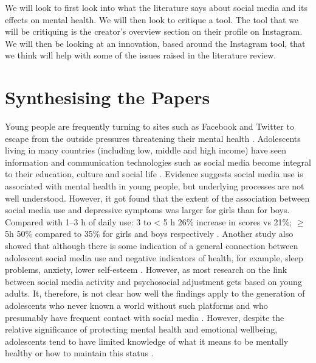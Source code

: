\documentclass{sigchi}
\begin{document}
	We will look to first look into what the literature says about social media and its effects on mental health. We will then look to critique a tool. The tool that we will be critiquing is the creator's overview section on their profile on Instagram. We will then be looking at an innovation, based around the Instagram tool, that we think will help with some of the issues raised in the literature review.


\section{Synthesising the Papers}
	Young people are frequently turning to sites such as Facebook and Twitter to escape from the outside pressures threatening their mental health \cite{boyd2014s}. Adolescents living in many countries (including low, middle and high income) have seen information and communication technologies such as social media become integral to their education, culture and social life \cite{allen2014social, van2013culture}. Evidence suggests social media use is associated with mental health in young people, but underlying processes are not well understood. However, it got found that the extent of the association between social media use and depressive symptoms was larger for girls than for boys. Compared with 1–3 h of daily use: 3 to < 5 h 26\% increase in scores vs 21\%; $\geq$ 5h 50\% compared to 35\% for girls and boys respectively \cite{kelly2018social}. Another study also showed that although there is some indication of a general connection between adolescent social media use and negative indicators of health, for example, sleep problems, anxiety, lower self-esteem \cite{underwood2017power, scott2018fear}. However, as most research on the link between social media activity and psychosocial adjustment gets based on young adults. It, therefore, is not clear how well the findings apply to the generation of adolescents who never known a world without such platforms and who presumably have frequent contact with social media \cite{barry2017adolescent}. However, despite the relative significance of protecting mental health and emotional wellbeing, adolescents tend to have limited knowledge of what it means to be mentally healthy or how to maintain this status \cite{dogra2012nigerian}.
	
\end{document}
